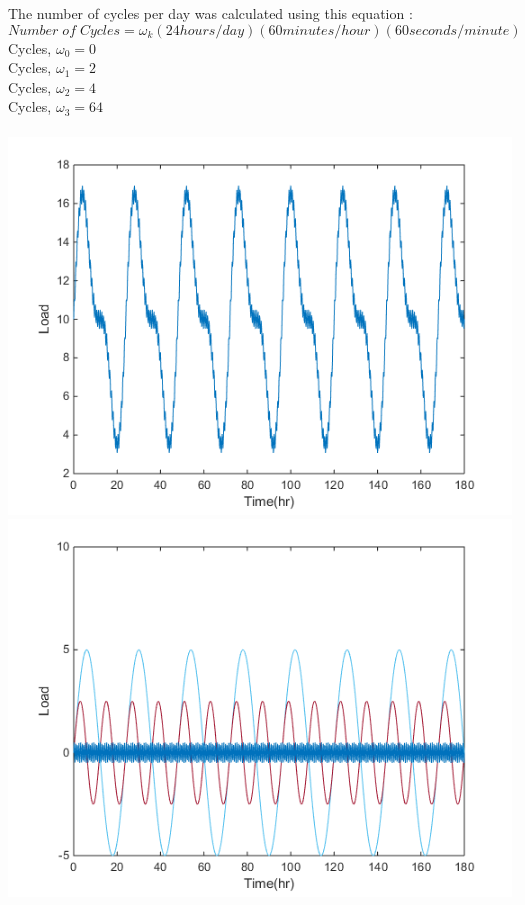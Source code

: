 \documentclass[10pt]{article}
\begin{document}
\noindent
The number of cycles per day was calculated using this equation :
\[ Number\;of\;Cycles=\omega_k(24 hours/day)(60minutes/hour)(60seconds/minute) \]
Cycles, $\omega_0 = 0$ \\
Cycles, $\omega_1 = 2$ \\
Cycles, $\omega_2 = 4$ \\
Cycles, $\omega_3 = 64$ \\
\\
\includegraphics{CBE660_Assign8_3_Fig2.png} \\
\includegraphics{CBE660_Assign8_3_Fig1.png}




\newpage
\end{document}

